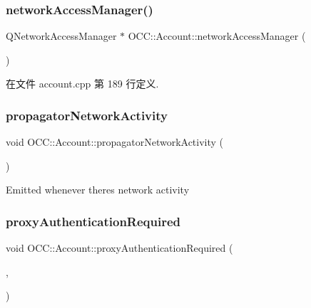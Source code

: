 \subsubsection{\texorpdfstring{network\+Access\+Manager()}{networkAccessManager()}}
{\footnotesize\ttfamily Q\+Network\+Access\+Manager $\ast$ O\+C\+C\+::\+Account\+::network\+Access\+Manager (\begin{DoxyParamCaption}{ }\end{DoxyParamCaption})}



在文件 account.\+cpp 第 189 行定义.

\mbox{\label{class_o_c_c_1_1_account_a9eed0b9618b1789cc9e16352f79a823d}} 
\subsubsection{\texorpdfstring{propagator\+Network\+Activity}{propagatorNetworkActivity}}
{\footnotesize\ttfamily void O\+C\+C\+::\+Account\+::propagator\+Network\+Activity (\begin{DoxyParamCaption}{ }\end{DoxyParamCaption})\hspace{0.3cm}{\ttfamily [signal]}}



Emitted whenever there\textquotesingle{}s network activity 

\mbox{\label{class_o_c_c_1_1_account_a44bc67fd9df027b4172900ea8b417d29}} 
\subsubsection{\texorpdfstring{proxy\+Authentication\+Required}{proxyAuthenticationRequired}}
{\footnotesize\ttfamily void O\+C\+C\+::\+Account\+::proxy\+Authentication\+Required (\begin{DoxyParamCaption}\item[{const Q\+Network\+Proxy \&}]{,  }\item[{Q\+Authenticator $\ast$}]{ }\end{DoxyParamCaption})\hspace{0.3cm}{\ttfamily [signal]}}



